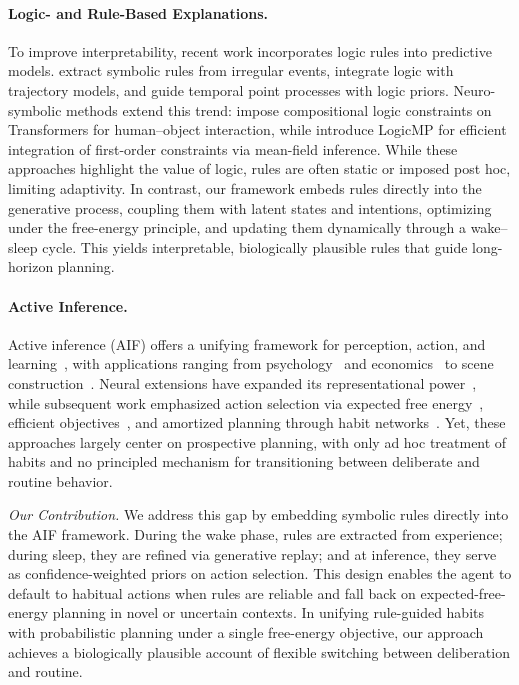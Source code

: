 \documentclass{article} %
\newcommand{\Shuang}[1]{{\color{red}{\sf[Shuang: #1]}}}
\newcommand{\Chao}[1]{{\color{blue}{\sf[Chao: #1]}}}
\begin{document}
\paragraph{Logic- and Rule-Based Explanations.}
To improve interpretability, recent work incorporates logic rules into predictive models. \citet{li2021explaining} extract symbolic rules from irregular events, \citet{cao2023discovering} integrate logic with trajectory models, and \citet{yangevolving} guide temporal point processes with logic priors. Neuro-symbolic methods extend this trend: \citet{li2023neural} impose compositional logic constraints on Transformers for human–object interaction, while \citet{xu2023logicmp} introduce LogicMP for efficient integration of first-order constraints via mean-field inference. While these approaches highlight the value of logic, rules are often static or imposed post hoc, limiting adaptivity. In contrast, our framework embeds rules directly into the generative process, coupling them with latent states and intentions, optimizing under the free-energy principle, and updating them dynamically through a wake–sleep cycle. This yields interpretable, biologically plausible rules that guide long-horizon planning.

\paragraph{Active Inference.} Active inference (AIF) offers a unifying framework for perception, action, and learning~\citep{mazzaglia2022free}, with applications ranging from psychology~\citep{goette2023validation, demekas2020investigation} and economics~\citep{henriksen2020variational} to scene construction~\citep{mirza2016scene, heins2020deep}. Neural extensions have expanded its representational power~\citep{ueltzhoffer2018deep}, while subsequent work emphasized action selection via expected free energy~\citep{friston2016active, friston2015active, friston2021sophisticated, millidge2020relationship}, efficient objectives~\citep{mazzaglia2021contrastive}, and amortized planning through habit networks~\citep{fountas2020deep}. Yet, these approaches largely center on prospective planning, with only ad hoc treatment of habits and no principled mechanism for transitioning between deliberate and routine behavior.

{\it Our Contribution.} We address this gap by embedding symbolic rules directly into the AIF framework. During the wake phase, rules are extracted from experience; during sleep, they are refined via generative replay; and at inference, they serve as confidence-weighted priors on action selection. This design enables the agent to default to habitual actions when rules are reliable and fall back on expected-free-energy planning in novel or uncertain contexts. In unifying rule-guided habits with probabilistic planning under a single free-energy objective, our approach achieves a biologically plausible account of flexible switching between deliberation and routine.
\end{document}
